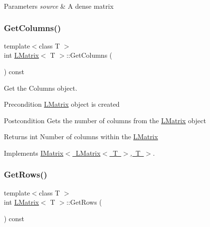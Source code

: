 \begin{DoxyParams}{Parameters}
{\em source} & A dense matrix \\
\hline
\end{DoxyParams}
\mbox{\label{class_l_matrix_ae7adc0f92e3648751fe49852ad158ea2}} 
\subsubsection{\texorpdfstring{GetColumns()}{GetColumns()}}
{\footnotesize\ttfamily template$<$class T $>$ \\
int \mbox{\hyperlink{class_l_matrix}{L\+Matrix}}$<$ T $>$\+::Get\+Columns (\begin{DoxyParamCaption}{ }\end{DoxyParamCaption}) const\hspace{0.3cm}{\ttfamily [virtual]}}



Get the Columns object. 

\begin{DoxyPrecond}{Precondition}
\mbox{\hyperlink{class_l_matrix}{L\+Matrix}} object is created 
\end{DoxyPrecond}
\begin{DoxyPostcond}{Postcondition}
Gets the number of columns from the \mbox{\hyperlink{class_l_matrix}{L\+Matrix}} object 
\end{DoxyPostcond}
\begin{DoxyReturn}{Returns}
int Number of columns within the \mbox{\hyperlink{class_l_matrix}{L\+Matrix}} 
\end{DoxyReturn}


Implements \mbox{\hyperlink{class_i_matrix_a3b84da3898ef38bdf281c13f218fc278}{I\+Matrix$<$ L\+Matrix$<$ T $>$, T $>$}}.

\mbox{\label{class_l_matrix_ad4ed9d329dbd01d010504a97b3879442}} 
\subsubsection{\texorpdfstring{GetRows()}{GetRows()}}
{\footnotesize\ttfamily template$<$class T $>$ \\
int \mbox{\hyperlink{class_l_matrix}{L\+Matrix}}$<$ T $>$\+::Get\+Rows (\begin{DoxyParamCaption}{ }\end{DoxyParamCaption}) const\hspace{0.3cm}{\ttfamily [virtual]}}




